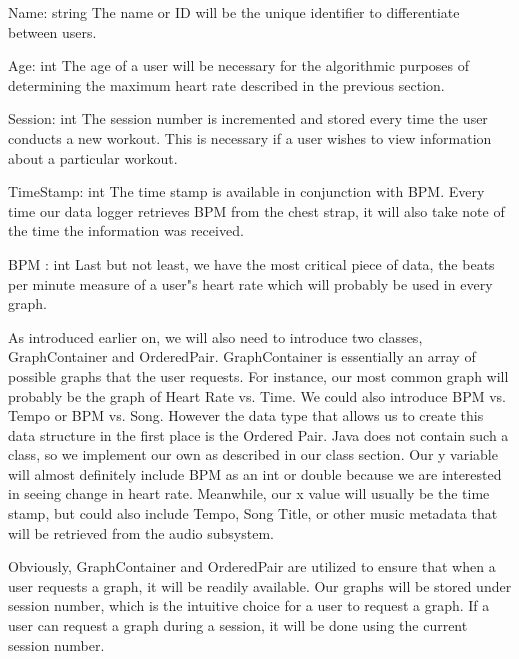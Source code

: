 \documentclass[letterpaper,english, 12pt]{scrreprt}
\begin{document}
Name: string \textendash The name or ID will be the unique identifier to differentiate between users. \newline

Age: int \textendash The age of a user will be necessary for the algorithmic purposes of determining the maximum heart rate described in the previous section. \newline

Session: int \textendash The session number is incremented and stored every time the user conducts a new workout. This is necessary if a user wishes to view information about a particular workout. \newline

TimeStamp: int \textendash The time stamp is available in conjunction with BPM. Every time our data logger retrieves BPM from the chest strap, it will also take note of the time the information was received. \newline

BPM : int \textendash Last but not least, we have the most critical piece of data, the beats per minute measure of a user"s heart rate which will probably be used in every graph. \newline

As introduced earlier on, we will also need to introduce two classes, GraphContainer and OrderedPair. GraphContainer is essentially an array of possible graphs that the user requests. For instance, our most common graph will probably be the graph of Heart Rate vs. Time. We could also introduce BPM vs. Tempo or BPM vs. Song. However the data type that allows us to create this data structure in the first place is the Ordered Pair. Java does not contain such a class, so we implement our own as described in our class section. Our y variable will almost definitely include BPM as an int or double because we are interested in seeing change in heart rate. Meanwhile, our x value will usually be the time stamp, but could also include Tempo, Song Title, or other music metadata that will be retrieved from the audio subsystem. \newline

Obviously, GraphContainer and OrderedPair are utilized to ensure that when a user requests a graph, it will be readily available. Our graphs will be stored under session number, which is the intuitive choice for a user to request a graph. If a user can request a graph during a session, it will be done using the current session number. 
\end{document}
